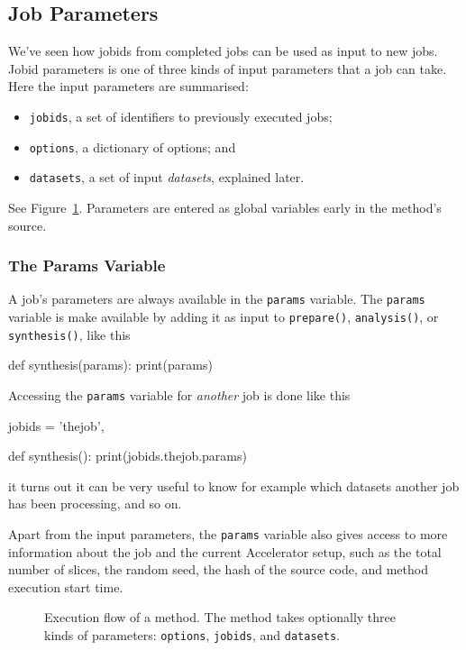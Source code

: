 \documentclass[a4paper]{article}
\begin{document}
\clearpage





\subsection{Job Parameters}


We've seen how jobids from completed jobs can be used as input to new
jobs.  Jobid parameters is one of three kinds of input parameters that
a job can take.  Here the input parameters are summarised:
\begin{itemize}
  \item[] \texttt{jobids}, a set of identifiers to previously executed jobs;
  \item[] \texttt{options}, a dictionary of options; and
  \item[] \texttt{datasets}, a set of input \textsl{datasets}, explained later.
\end{itemize}
See Figure~\ref{fig:execflow}.  Parameters are entered as global
variables early in the method's source.



\subsubsection{The Params Variable}
A job's parameters are always available in the \texttt{params}
variable.  The \texttt{params} variable is make available by adding it
as input to \texttt{prepare()}, \texttt{analysis()}, or
\texttt{synthesis()}, like this
\begin{python}
  def synthesis(params):
    print(params)
\end{python}
Accessing the \texttt{params} variable for \textsl{another} job is
done like this
\begin{python}
  jobids = {'thejob',}

  def synthesis():
    print(jobids.thejob.params)
\end{python}
it turns out it can be very useful to know for example which datasets
another job has been processing, and so on.

Apart from the input parameters, the \texttt{params} variable also
gives access to more information about the job and the current
Accelerator setup, such as the total number of slices, the random
seed, the hash of the source code, and method execution start time.


\begin{figure}[h!]
  \begin{center}
    
    \caption{Execution flow of a method.  The method takes optionally
      three kinds of parameters: \texttt{options}, \texttt{jobids},
      and \texttt{datasets}.}
    \label{fig:execflow}
  \end{center}
\end{figure}
\end{document}
